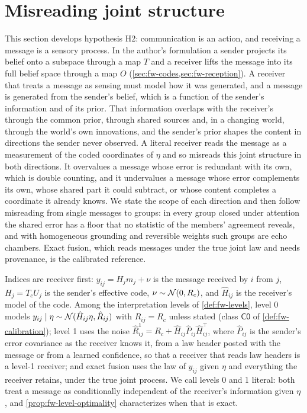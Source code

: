 \section{Misreading joint structure}\label{sec:mis}

This section develops hypothesis H2: communication is an action, and receiving a message is a sensory process. In the author's formulation a sender projects its belief onto a subspace through a map $T$ and a receiver lifts the message into its full belief space through a map $O$ (\cref{sec:fw-codes,sec:fw-reception}). A receiver that treats a message as sensing must model how it was generated, and a message is generated from the sender's belief, which is a function of the sender's information and of its prior. That information overlaps with the receiver's through the common prior, through shared sources and, in a changing world, through the world's own innovations, and the sender's prior shapes the content in directions the sender never observed. A literal receiver reads the message as a measurement of the coded coordinates of $\eta$ and so misreads this joint structure in both directions. It overvalues a message whose error is redundant with its own, which is double counting, and it undervalues a message whose error complements its own, whose shared part it could subtract, or whose content completes a coordinate it already knows. We state the scope of each direction and then follow misreading from single messages to groups: in every group closed under attention the shared error has a floor that no statistic of the members' agreement reveals, and with homogeneous grounding and reversible weights such groups are echo chambers. Exact fusion, which reads messages under the true joint law and needs provenance, is the calibrated reference.

Indices are receiver first: $y_{ij}=H_jm_j+\nu$ is the message received by $i$ from $j$, $H_j=T_cU_j$ is the sender's effective code, $\nu\sim\mathcal{N}(0,R_c)$, and $\hat H_{ij}$ is the receiver's model of the code. Among the interpretation levels of \cref{def:fw-levels}, level 0 models $y_{ij}\mid\eta\sim\mathcal{N}(\hat H_{ij}\eta,\hat R_{ij})$ with $\hat R_{ij}=R_c$ unless stated (class $\mathsf{C0}$ of \cref{def:fw-calibration}); level 1 uses the noise $\hat R^1_{ij}=R_c+\hat H_{ij}\hat P_{ij}\hat H_{ij}^\top$, where $\hat P_{ij}$ is the sender's error covariance as the receiver knows it, from a law header posted with the message or from a learned confidence, so that a receiver that reads law headers is a level-1 receiver; and exact fusion uses the law of $y_{ij}$ given $\eta$ and everything the receiver retains, under the true joint process. We call levels 0 and 1 literal: both treat a message as conditionally independent of the receiver's information given $\eta$, and \cref{prop:fw-level-optimality} characterizes when that is exact.

